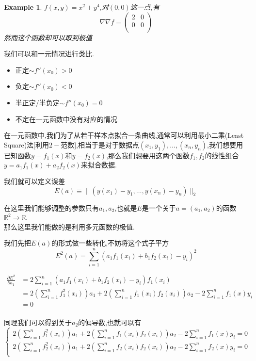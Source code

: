 \documentclass[11pt,hyperref,a4paper,UTF8]{ctexart}
\newtheorem{example}{Example}[subsection]
\newcommand{\RR}{\mathbb{R}}
\newcommand{\parameter}[1]{\left(#1\right)}
\begin{document}
\begin{CJK}{UTF8}{gkai}
\begin{example}
  $f(x,y) = x^2 + y^4$,对$(0,0)$这一点,有
  \[\nabla \nabla f = \begin{pmatrix}
    2&0\\
    0&0\\
  \end{pmatrix}\]
  然而这个函数却可以取到极值
\end{example}

我们可以和一元情况进行类比.

\begin{itemize}
  \item 正定$\sim f''(x_0) > 0$
  \item 负定$\sim f''(x_0) < 0$
  \item 半正定/半负定$\sim f''(x_0) = 0$
  \item 不定在一元函数中没有对应的情况
\end{itemize}

在一元函数中,我们为了从若干样本点拟合一条曲线,通常可以利用最小二乘(Least Square)法[利用$2-$范数],相当于是对于数据点$(x_1,y_1),\ldots,(x_n,y_n)$,我们想要用已知函数$y = f_1(x)$和$y = f_2(x)$,那么我们想要用这两个函数$f_1,f_2$的线性组合$y = a_1 f_1(x) + a_2 f_2(x)$来拟合数据.

我们就可以定义误差
\[E(a) \equiv \|(y(x_1) - y_1,\ldots,y(x_n) - y_n)\|_2\]

在这里我们能够调整的参数只有$a_1,a_2$,也就是$E$是一个关于$a = (a_1,a_2)$的函数$\RR^2 \to \RR$.\\

那么这里我们能做的是利用多元函数的极值.

我们先把$E(a)$的形式做一些转化,不妨将这个式子平方
\[E^2(a) = \sum_{i = 1}^n \parameter{a_1 f_1(x_i) + b_1 f_2(x_i) - y_i}^2\]

\[
\begin{aligned}
  \frac{\partial E^2}{\partial a_1} &= 2 \sum_{i = 1}^n \parameter{a_1 f_1(x_i) + b_1 f_2(x_i) - y_i} f_1(x_i)\\
  &= 2 \parameter{\sum_{i = 1}^{n}f_1^2(x_i)}a_1 + 2 \parameter{\sum_{i = 1}^{n}f_1(x_i)f_2(x_i)}a_2 - 2 \sum_{i = 1}^{n}f_1(x)y_i\\
  &= 0\\
\end{aligned}  
\]

同理我们可以得到关于$a_2$的偏导数,也就可以有
\[\begin{cases}
  2 \parameter{\sum_{i = 1}^{n}f_1^2(x_i)}a_1 + 2 \parameter{\sum_{i = 1}^{n}f_1(x_i)f_2(x_i)}a_2 - 2 \sum_{i = 1}^{n}f_1(x)y_i = 0\\
  2 \parameter{\sum_{i = 1}^{n}f_2^2(x_i)}a_1 + 2 \parameter{\sum_{i = 1}^{n}f_2(x_i)f_2(x_i)}a_2 - 2 \sum_{i = 1}^{n}f_2(x)y_i = 0\\
\end{cases}\]


\end{CJK}
\end{document}
